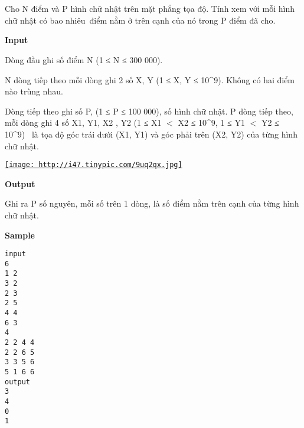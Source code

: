 

 

 

Cho N điểm và P hình chữ nhật trên mặt phẳng tọa độ. Tính xem với mỗi hình chữ nhật có bao nhiêu điểm nằm ở trên cạnh của nó trong P điểm đã cho.

\textbf{Input}

Dòng đầu ghi số điểm N (1 ≤ N ≤ 300 000).

N dòng tiếp theo mỗi dòng ghi 2 số X, Y (1 ≤ X, Y ≤ 10^9). Không có hai điểm nào trùng nhau.

Dòng tiếp theo ghi số P, (1 ≤ P ≤ 100 000), số hình chữ nhật. P dòng tiếp theo, mỗi dòng ghi 4 số X1, Y1, X2 , Y2 (1 ≤ X1 $<$ X2 ≤ 10^9, 1 ≤ Y1 $<$ Y2 ≤ 10^9)  là tọa độ góc trái dưới (X1, Y1) và góc phải trên (X2, Y2) của từng hình chữ nhật.

\href{http://tinypic.com}{
\texttt{[image: http://i47.tinypic.com/9uq2qx.jpg]}}

\textbf{Output}

Ghi ra P số nguyên, mỗi số trên 1 dòng, là số điểm nằm trên cạnh của từng hình chữ nhật.

\textbf{Sample}
\begin{verbatim}
input  
6 
1 2 
3 2 
2 3 
2 5 
4 4 
6 3 
4 
2 2 4 4 
2 2 6 5 
3 3 5 6 
5 1 6 6  
output  
3 
4 
0 
1
\end{verbatim}
